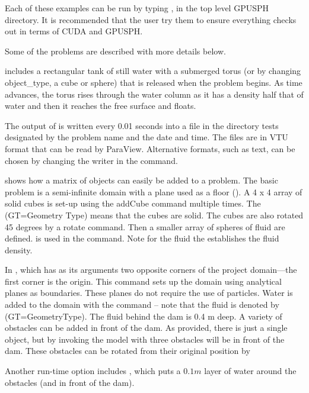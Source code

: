 \documentclass{../GPUSPHtemplate}
\begin{document}
Each of these examples can be run by typing ,
in the top level GPUSPH directory.  
It is recommended that the user try them to ensure 
everything checks out in terms of CUDA and GPUSPH.

Some of the problems are described with more details below.

 includes a rectangular tank of still water with a submerged torus 
(or by changing object_type, a cube or sphere) that is released when the problem begins.  
As time advances, the torus rises through the water column as it has a 
density half that of water and then it reaches the free surface and floats.

The output of  is written every 0.01 seconds into a file 
in the directory tests designated by the problem name and the date and time.  
The files are in VTU format that can be read by ParaView.  
Alternative formats, such as text, can be chosen by changing the writer in the  command.

 shows how a matrix of objects can easily be added to a problem.  
The basic problem is a semi-infinite domain with a plane used as a floor ().  
A 4 x 4 array of solid cubes is set-up using the addCube command multiple times.   
The   (GT=Geometry Type) means that the cubes are solid. 
The cubes are also rotated 45 degrees by a rotate command. 
Then a smaller array of spheres of fluid are defined.  
 is used in the  command.  
Note for the fluid the  establishes the fluid density. 

In  , 
which has as its arguments two opposite corners of the 
project domain—the first corner is the origin. 
This command sets up the domain using analytical planes as boundaries. 
These planes do not require the use of particles.  
Water is added to the domain with the  command -- 
note that the fluid is denoted by   (GT=GeometryType).  
The fluid behind the dam is 0.4 m deep.  
A variety of obstacles can be added in front of the dam.  
As provided, there is just a single object, but by invoking the model with
three obstacles will be in front of the dam.  
These obstacles can be rotated from their original position 
by 

Another run-time option includes , 
which puts a $0.1m$ layer of water around the obstacles (and in front of the dam).  
\end{document}
